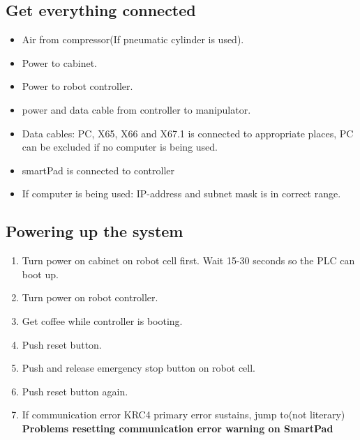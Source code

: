 \documentclass{article}
\begin{document}
    \subsection{Get everything connected}
    \begin{itemize}
        \item Air from compressor(If pneumatic cylinder is used).
        \item Power to cabinet.
        \item Power to robot controller.
        \item power and data cable from controller to manipulator.
        \item Data cables: PC, X65, X66 and X67.1 is connected to appropriate places, PC can be excluded if no computer is being used.
        \item smartPad is connected to controller
        \item If computer is being used: IP-address and subnet mask is in correct range.
    \end{itemize}
    
    \subsection{Powering up the system}
    \begin{enumerate}
        \item Turn power on cabinet on robot cell first. Wait 15-30 seconds so the PLC can boot up.
        \item Turn power on robot controller.
        \item Get coffee while controller is booting.
        \item Push reset button.
        \item Push and release emergency stop button on robot cell.
        \item Push reset button again.
        \item If communication error KRC4 primary error sustains, jump to(not literary) \textbf{Problems resetting communication error warning on SmartPad} 
    \end{enumerate}
\end{document}
